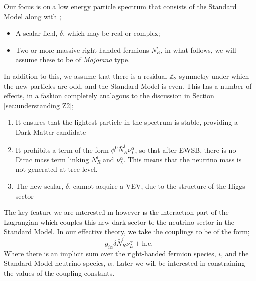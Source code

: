 \documentclass[11pt]{article}
\numberwithin{equation}{section}
\numberwithin{figure}{section}
\numberwithin{table}{section}
\begin{document}
Our focus is on a low energy particle spectrum that consists of the Standard Model along with \cite{Farzan2014, Farzan2011};
\begin{itemize}
  \item A scalar field, $\delta$, which may be real or complex;
  \item Two or more massive right-handed fermions $N^i_R$, in what follows, we will assume these to be of \textit{Majorana} type.
\end{itemize}
In addition to this, we assume that there is a residual $\mathbb{Z}_2$ symmetry \cite{Ma1998, Ma2001, Ma2006} under which the new particles are odd, and the Standard Model is even. This has a number of effects, in a fashion completely analagous to the discussion in Section \ref{sec:understanding Z2};
\begin{enumerate}
  \item It ensures that the lightest particle in the spectrum is stable, providing a Dark Matter candidate
  \item It prohibits a term of the form $\phi^0 \bar{N}_R^i \nu^\alpha_L$, so that after EWSB, there is no Dirac mass term linking $N^i_R$ and $\nu^\alpha_L$. This means that the neutrino mass is not generated at tree level.
  \item The new scalar, $\delta$, cannot acquire a VEV, due to the structure of the Higgs sector
\end{enumerate}
The key feature we are interested in however is the interaction part of the Lagrangian which couples this new dark sector to the neutrino sector in the Standard Model. In our effective theory, we take the couplings to be of the form;
\begin{equation}\label{eq:effective lagrangian}
  g_{i\alpha}\delta \bar{N}^i_R \nu^\alpha_L + \text{h.c.}
\end{equation}
\noindent Where there is an implicit sum over the right-handed fermion species, $i$, and the Standard Model neutrino species, $\alpha$. Later we will be interested in constraining the values of the coupling constants.
\end{document}
